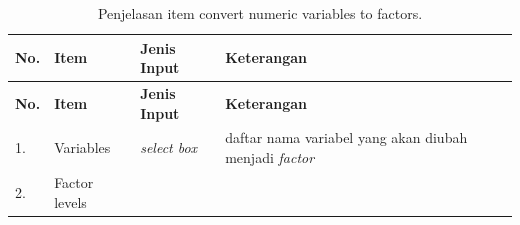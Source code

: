 \documentclass[12pt,]{krantz}
\begin{document}
\begin{longtable}[]{@{}llll@{}}
\caption{\label{tab:numtofac2} Penjelasan item convert numeric variables to factors.}\tabularnewline
\toprule
\begin{minipage}[b]{0.04\columnwidth}\raggedright
\textbf{No.}\strut
\end{minipage} & \begin{minipage}[b]{0.14\columnwidth}\raggedright
\textbf{Item}\strut
\end{minipage} & \begin{minipage}[b]{0.09\columnwidth}\raggedright
\textbf{Jenis Input}\strut
\end{minipage} & \begin{minipage}[b]{0.61\columnwidth}\raggedright
\textbf{Keterangan}\strut
\end{minipage}\tabularnewline
\midrule
\endfirsthead
\toprule
\begin{minipage}[b]{0.04\columnwidth}\raggedright
\textbf{No.}\strut
\end{minipage} & \begin{minipage}[b]{0.14\columnwidth}\raggedright
\textbf{Item}\strut
\end{minipage} & \begin{minipage}[b]{0.09\columnwidth}\raggedright
\textbf{Jenis Input}\strut
\end{minipage} & \begin{minipage}[b]{0.61\columnwidth}\raggedright
\textbf{Keterangan}\strut
\end{minipage}\tabularnewline
\midrule
\endhead
\begin{minipage}[t]{0.04\columnwidth}\raggedright
1.\strut
\end{minipage} & \begin{minipage}[t]{0.14\columnwidth}\raggedright
Variables\strut
\end{minipage} & \begin{minipage}[t]{0.09\columnwidth}\raggedright
\emph{select box}\strut
\end{minipage} & \begin{minipage}[t]{0.61\columnwidth}\raggedright
daftar nama variabel yang akan diubah menjadi \emph{factor}\strut
\end{minipage}\tabularnewline
\begin{minipage}[t]{0.04\columnwidth}\raggedright
2.\strut
\end{minipage} & \begin{minipage}[t]{0.14\columnwidth}\raggedright
Factor levels\strut

\end{minipage}
\end{longtable}
\end{document}

